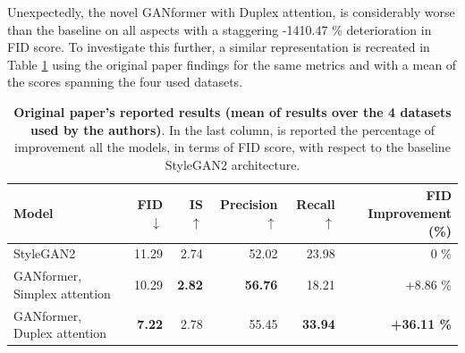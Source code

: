 \documentclass{article}
\begin{document}
	Unexpectedly, the novel GANformer with Duplex attention, is considerably worse than the baseline 
	on all aspects with a staggering -1410.47 \% deterioration in FID score.
	To investigate this further, a similar representation is recreated in Table \ref{tab:orig-results} using 
	the original paper findings for the same metrics and with a mean of the scores spanning the four 
	used datasets.
	\begin{table}[htb]
		\centering
		\caption{\textbf{Original paper's reported results (mean of results over the 4 datasets used by the 
				authors)}. In the last column, is reported the percentage of improvement all the models, in 
			terms 
			of FID score, with respect to the baseline StyleGAN2 architecture.}
		\label{tab:orig-results}
		\vspace{3mm}
		\small
		\begin{tabular}{l|rrrrr}
			\toprule
			\textbf{Model}  & \textbf{FID $\downarrow$}  & \textbf{IS $\uparrow$} & 
			\textbf{Precision$\uparrow$}  & \textbf{Recall $\uparrow$} & \textbf{FID Improvement (\%)}\\ 
			\midrule
			StyleGAN2                    & 11.29 & 2.74 & 52.02      & 23.98 & 0 \% \\ 
			{GANformer, Simplex attention} & 10.29 & \textbf{2.82}   & \textbf{56.76}     & 18.21  & 
			+8.86 \% \\ 
			{GANformer, Duplex attention}  & \textbf{7.22}   & 2.78 & 55.45     & \textbf{33.94} & 
			\textbf{+36.11 \%} 
			\\ 
			\bottomrule
		\end{tabular}
	\end{table}
	
\end{document}
